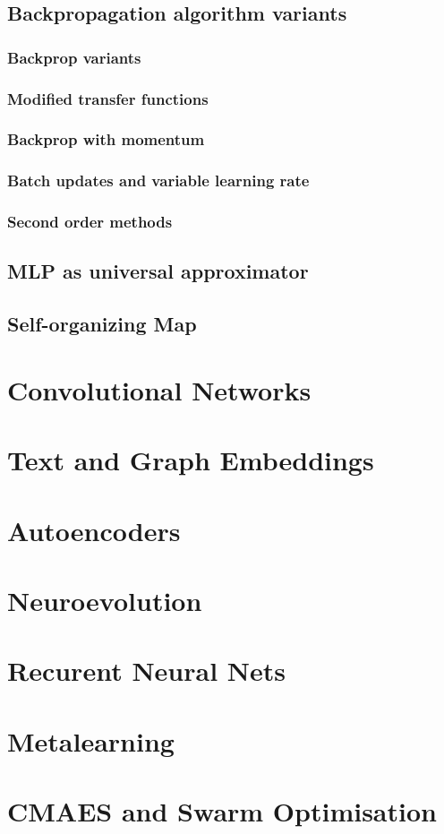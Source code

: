 \documentclass[12pt, letterpaper]{article}
\begin{document}
\subsection{Backpropagation algorithm variants}

\subsubsection{Backprop variants}

\subsubsection{Modified transfer functions}

\subsubsection{Backprop with momentum}

\subsubsection{Batch updates and variable learning rate}

\subsubsection{Second order methods}

\subsection{MLP as universal approximator}

\subsection{Self-organizing Map}

\section{Convolutional Networks}

\section{Text and Graph Embeddings}

\section{Autoencoders}

\section{Neuroevolution}

\section{Recurent Neural Nets}

\section{Metalearning}

\section{CMAES and Swarm Optimisation}
\end{document}
